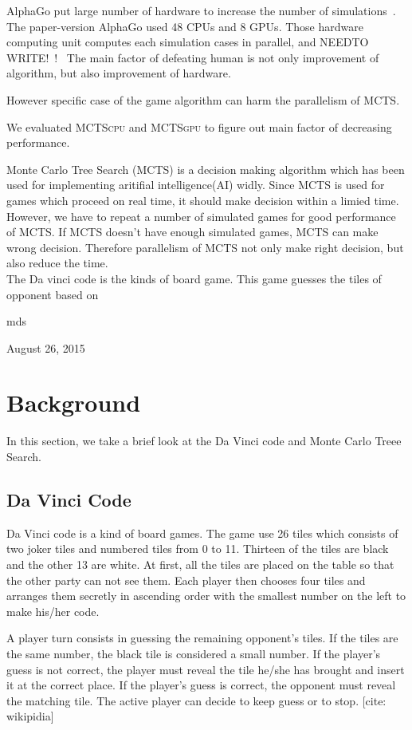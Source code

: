 \documentclass[conference]{IEEEtran}
\newcommand{\cpu} {\textsc{MCTScpu} }
\newcommand{\gpu} {\textsc{MCTSgpu} }
\begin{document}
AlphaGo put large number of hardware to increase the number of simulations~\cite{silver2016mastering_alphago}.
The paper-version AlphaGo used 48 CPUs and 8 GPUs.
Those hardware computing unit computes each simulation cases in parallel, and NEEDTO WRITE!~!~
The main factor of defeating human is not only improvement of algorithm, but also improvement of hardware.


However specific case of the game algorithm can harm the parallelism of MCTS.

We evaluated \cpu and \gpu to figure out main factor of decreasing performance.



Monte Carlo Tree Search (MCTS) is a decision making algorithm which has been used for implementing aritifial intelligence(AI) widly. Since MCTS is used for games which proceed on real time, it should make decision within a limied time. However, we have to repeat a number of simulated games for good performance of MCTS. If MCTS doesn't have enough simulated games, MCTS can make wrong decision. Therefore parallelism of MCTS not only make right decision, but also reduce the time.\\
The Da vinci code is the kinds of board game. This game guesses the tiles of opponent based on 

\hfill mds
 
\hfill August 26, 2015
\section{Background}
In this section, we take a brief look at the Da Vinci code and Monte Carlo Treee Search. 
\subsection{Da Vinci Code}
Da Vinci code is a kind of board games. 
The game use 26 tiles which consists of two joker tiles and numbered tiles from 0 to 11. 
Thirteen of the tiles are black and the other 13 are white.
At first, all the tiles are placed on the table so that the other party can not see them.
Each player then chooses four tiles and arranges them secretly in ascending order with the smallest number on the left to make his/her code. 

A player turn consists in guessing the remaining opponent's tiles. 
If the tiles are the same number, the black tile is considered a small number.
If the player's guess is not correct, the player must reveal the tile he/she has brought and insert it at the correct place.
If the player's guess is correct, the opponent must reveal the matching tile.
The active player can decide to keep guess or to stop.
[cite: wikipidia]
\end{document}
